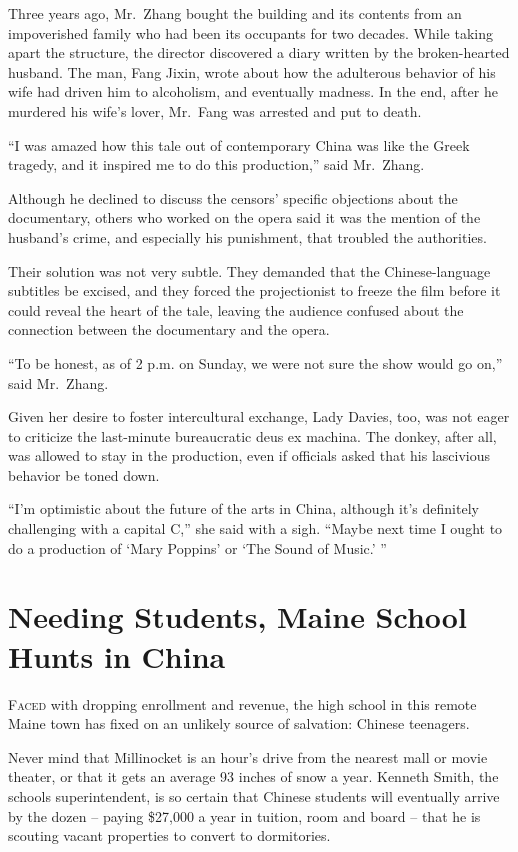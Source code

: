 ﻿\documentclass[12pt]{article}
\begin{document}
Three years ago, Mr.~Zhang bought the building and its contents from an impoverished family who had
been its occupants for two decades. While taking apart the structure, the director discovered a
diary written by the broken-hearted husband. The man, Fang Jixin, wrote about how the adulterous
behavior of his wife had driven him to alcoholism, and eventually madness. In the end, after he
murdered his wife's lover, Mr.~Fang was arrested and put to death.

``I was amazed how this tale out of contemporary China was like the Greek tragedy, and it inspired
me to do this production,'' said Mr.~Zhang.

Although he declined to discuss the censors' specific objections about the documentary, others who
worked on the opera said it was the mention of the husband's crime, and especially his punishment,
that troubled the authorities.

Their solution was not very subtle. They demanded that the Chinese-language subtitles be excised,
and they forced the projectionist to freeze the film before it could reveal the heart of the tale,
leaving the audience confused about the connection between the documentary and the opera.

``To be honest, as of 2 p.m. on Sunday, we were not sure the show would go on,'' said Mr.~Zhang.

Given her desire to foster intercultural exchange, Lady Davies, too, was not eager to criticize the
last-minute bureaucratic deus ex machina. The donkey, after all, was allowed to stay in the
production, even if officials asked that his lascivious behavior be toned down.

``I'm optimistic about the future of the arts in China, although it's definitely challenging with a
capital C,'' she said with a sigh. ``Maybe next time I ought to do a production of `Mary Poppins' or
`The Sound of Music.' ''

\section{Needing Students, Maine School Hunts in China}

\lettrine{F}{aced} with dropping enrollment and revenue, the high school in
this remote Maine town has fixed on an unlikely source of salvation: Chinese teenagers.

Never mind that Millinocket is an hour's drive from the nearest mall or movie theater, or that it
gets an average 93 inches of snow a year. Kenneth Smith, the schools superintendent, is so certain
that Chinese students will eventually arrive by the dozen -- paying \$27,000 a year in tuition, room
and board -- that he is scouting vacant properties to convert to dormitories.
\end{document}
